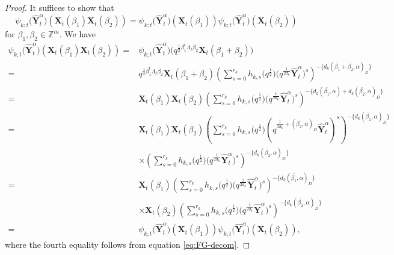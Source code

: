 \documentclass[11pt]{article}
\numberwithin{equation}{section}
\numberwithin{equation}{section}
\begin{document}
 \begin{proof}
It suffices to show that
 \[\psi_{k;t}\bigl(\mathbf{\hat{Y}}_{t}^{\alpha}\bigr)(\mathbf{X}_{t}(\beta_1)\mathbf{X}_{t}(\beta_2))=\psi_{k;t}\bigl(\mathbf{\hat{Y}}_{t}^{\alpha}\bigr)(\mathbf{X}_{t}(\beta_1))\psi_{k;t}\bigl(\mathbf{\hat{Y}}_{t}^{\alpha}\bigr)(\mathbf{X}_{t}(\beta_2))\]
for $\beta_{1},\beta_2\in\mathbb{Z}^{m}$. We have
\begin{align*}
 \psi_{k;t}\bigl(\mathbf{\hat{Y}}_{t}^{\alpha}\bigr)(\mathbf{X}_{t}(\beta_1)\mathbf{X}_{t}(\beta_2))
 ={}&\psi_{k;t}\bigl(\mathbf{\hat{Y}}_{t}^{\alpha}\bigr)\bigl(q^{\frac{1}{2}\beta_{1}^{t}\Lambda_{t}\beta_{2}}\mathbf{X}_{t}(\beta_1+\beta_2)\bigr)\\
 ={}&q^{\frac{1}{2}\beta_{1}^{t}\Lambda_{t}\beta_{2}}\mathbf{X}_{t}(\beta_{1}+\beta_{2})\left(\sum\limits_{s=0}^{r_k} h_{k,s}\bigl(q^{\frac{1}{2}}\bigr)\bigl(q^{\frac{1}{2d_{k}}}\mathbf{\hat{Y}}_{t}^{\alpha}\bigr)^{s}\right)^{-\{d_{k}(\bar{\beta_{1}}+\bar{\beta_{2}},\alpha)_D\}}\\
 ={}&\mathbf{X}_{t}(\beta_{1})\mathbf{X}_{t}(\beta_{2})\left(\sum\limits_{s=0}^{r_k} h_{k,s}\bigl(q^{\frac{1}{2}}\bigr)\bigl(q^{\frac{1}{2d_{k}}}\mathbf{\hat{Y}}_{t}^{\alpha}\bigr)^{s}\right)^{-\{d_{k}(\bar{\beta_{1}},\alpha)+d_k(\bar{\beta_{2}},\alpha)_D\}}\\
={}&\mathbf{X}_{t}(\beta_{1})\mathbf{X}_{t}(\beta_{2})\left(\sum\limits_{s=0}^{r_k} h_{k,s}\bigl(q^{\frac{1}{2}}\bigr)(q^{\frac{1}{2d_{k}}+ (\bar{\beta_{2}},\alpha)_D}\mathbf{\hat{Y}}_{t}^{\alpha})^{s}\right)^{-\{d_{k}(\bar{\beta_{1}},\alpha)_D\}}\\
&\times\left(\sum\limits_{s=0}^{r_k} h_{k,s}\bigl(q^{\frac{1}{2}}\bigr)\bigl(q^{\frac{1}{2d_{k}}}\mathbf{\hat{Y}}_{t}^{\alpha}\bigr)^{s}\right)^{-\{d_{k}(\bar{\beta_{2}},\alpha)_D\}}\\
={}&\mathbf{X}_{t}(\beta_{1})\left(\sum\limits_{s=0}^{r_k} h_{k,s}\bigl(q^{\frac{1}{2}}\bigr)\bigl(q^{\frac{1}{2d_{k}}}\mathbf{\hat{Y}}_{t}^{\alpha}\bigr)^{s}\right)^{-\{d_{k}(\bar{\beta_{1}},\alpha)_D\}}\\
&\times\mathbf{X}_{t}(\beta_{2})\left(\sum\limits_{s=0}^{r_k} h_{k,s}\bigl(q^{\frac{1}{2}}\bigr)\bigl(q^{\frac{1}{2d_{k}}}\mathbf{\hat{Y}}_{t}^{\alpha}\bigr)^{s}\right)^{-\{d_{k}(\bar{\beta_{2}},\alpha)_D\}}\\
={}&\psi_{k;t}\bigl(\mathbf{\hat{Y}}_{t}^{\alpha}\bigr)(\mathbf{X}_{t}(\beta_1))\psi_{k;t}\bigl(\mathbf{\hat{Y}}_{t}^{\alpha}\bigr)(\mathbf{X}_{t}(\beta_2)),
\end{align*}
where the fourth equality follows from equation \eqref{eq:FG-decom}.
\end{proof}
\end{document}
